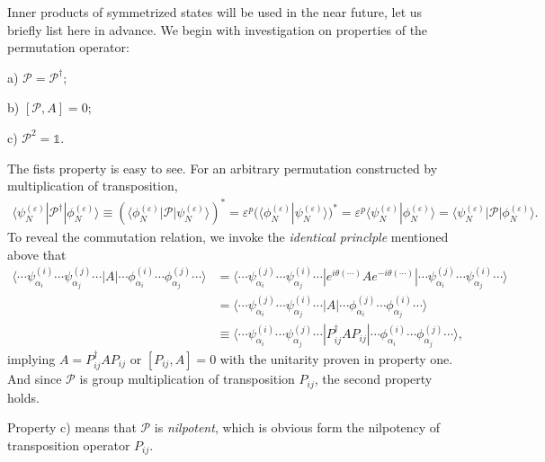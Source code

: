 \documentclass[b5paper,10pt,UTF8]{book}
\numberwithin{equation}{section}
\begin{document}
 		\hfill\par
 		Inner products of symmetrized states will be used in the near future, let us briefly list here in advance. We begin with investigation on properties of the permutation operator:
 		\begin{Property}\hfill\par
 			a) $\mathcal{P}=\mathcal{P}^\dagger$;\par
 			b) $[\mathcal{P},A]=0$;\par
 			c) $\mathcal{P}^2=\mathbb{1}$.
 		\end{Property}
 		\begin{Proof}
 			The fists property is easy to see. For an arbitrary permutation constructed by multiplication of transposition,
 			\begin{align*}
 				\langle\psi_N^{(\varepsilon)}|\mathcal{P}^\dagger|\phi_N^{(\varepsilon)}\rangle\equiv(\langle\phi_N^{(\varepsilon)}|\mathcal{P}|\psi_N^{(\varepsilon)}\rangle)^*=\varepsilon^p(\langle\phi_N^{(\varepsilon)}|\psi_N^{(\varepsilon)}\rangle)^*=\varepsilon^p\langle\psi_N^{(\varepsilon)}|\phi_N^{(\varepsilon)}\rangle=\langle\psi_N^{(\varepsilon)}|\mathcal{P}|\phi_N^{(\varepsilon)}\rangle.
 			\end{align*}
 			\indent To reveal the commutation relation, we invoke the \emph{identical princlple} mentioned above that
 			\begin{align*}
 				\langle\cdots\psi^{(i)}_{\alpha_i}\cdots\psi^{(j)}_{\alpha_j}\cdots|A|\cdots\phi^{(i)}_{\alpha_i}\cdots\phi^{(j)}_{\alpha_j}\cdots\rangle&=\langle\cdots\psi^{(j)}_{\alpha_i}\cdots\psi^{(i)}_{\alpha_j}\cdots|e^{i\theta(\cdots)}Ae^{-i\theta(\cdots)}|\cdots\psi^{(j)}_{\alpha_i}\cdots\psi^{(i)}_{\alpha_j}\cdots\rangle\\
 				&=\langle\cdots\psi^{(j)}_{\alpha_i}\cdots\psi^{(i)}_{\alpha_j}\cdots|A|\cdots\phi^{(j)}_{\alpha_i}\cdots\phi^{(i)}_{\alpha_j}\cdots\rangle\\
 				&\equiv\langle\cdots\psi^{(i)}_{\alpha_i}\cdots\psi^{(j)}_{\alpha_j}\cdots|P_{ij}^\dagger AP_{ij}|\cdots\phi^{(i)}_{\alpha_i}\cdots\phi^{(j)}_{\alpha_j}\cdots\rangle,
 			\end{align*}
 			implying $A=P_{ij}^\dagger AP_{ij}$ or $[P_{ij},A]=0$ with the unitarity proven in property one. And since $\mathcal{P}$ is group multiplication of transposition $P_{ij}$, the second property holds.\par
 			Property c) means that $\mathcal{P}$ is \emph{nilpotent}, which is obvious form the nilpotency of transposition operator $P_{ij}$.
 		\end{Proof}
\end{document}
